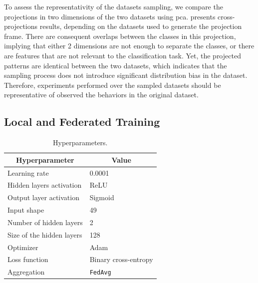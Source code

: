 To assess the representativity of the datasets sampling, we compare the projections in two dimensions of the two datasets using \gls{pca}.
 presents cross-projections results, depending on the datasets used to generate the projection frame.
There are consequent overlaps between the classes in this projection, implying that either 2 dimensions are not enough to separate the classes, or there are features that are not relevant to the classification task.
Yet, the projected patterns are identical between the two datasets, which indicates that the sampling process does not introduce significant distribution bias in the dataset.
Therefore, experiments performed over the sampled datasets should be representative of observed the behaviors in the original dataset.


\subsection{Local and Federated Training\label{sec:assess.method.models}}

\begin{table}
  \newcommand{\cellcenter}[1]{\multicolumn{1}{c}{#1}}
  \centering
  \caption{Hyperparameters.\label{tbl:hyperparams}}
  \small
  \begin{tabular}{ll}
    \toprule %
    \cellcenter{\textbf{Hyperparameter}}   & \cellcenter{\textbf{Value}} \\
    \midrule %
    Learning rate             & 0.0001 \\
    Hidden layers activation  & ReLU \\
    Output layer activation   & Sigmoid \\
    Input shape               & 49 \\
    Number of hidden layers   & 2 \\ 
    Size of the hidden layers & 128 \\
    Optimizer                 & Adam \\
    Loss function             & Binary cross-entropy \\
    Aggregation               & \texttt{FedAvg} \\
    \bottomrule %
  \end{tabular}
\end{table}

